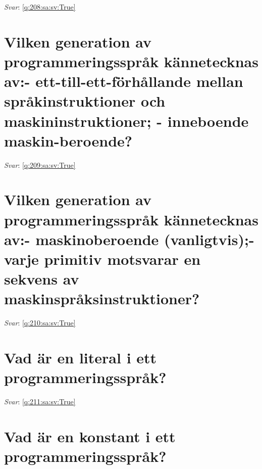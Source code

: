 \documentclass[a4paper,11pt,oneside]{book}
\begin{document}
\begin{sloppypar}
\textit{Svar}: \autoref{q:208:sa:sv:True}



\section{Vilken generation av programmeringsspr\r{a}k k\"annetecknas av:- ett-till-ett-f\"orh\r{a}llande mellan spr\r{a}kinstruktioner och maskininstruktioner; - inneboende maskin-beroende?}

\label{q:209:sa:sv:False}

\vspace{2cm}

\noindent\makebox[\textwidth]{\hrulefill}

\vspace{1cm}

\textit{Svar}: \autoref{q:209:sa:sv:True}



\section{Vilken generation av programmeringsspr\r{a}k k\"annetecknas av:- maskinoberoende (vanligtvis);- varje primitiv motsvarar en sekvens av maskinspr\r{a}ksinstruktioner?}

\label{q:210:sa:sv:False}

\vspace{2cm}

\noindent\makebox[\textwidth]{\hrulefill}

\vspace{1cm}

\textit{Svar}: \autoref{q:210:sa:sv:True}



\section{Vad \"ar en literal i ett programmeringsspr\r{a}k?}

\label{q:211:sa:sv:False}

\vspace{2cm}

\noindent\makebox[\textwidth]{\hrulefill}

\vspace{1cm}

\textit{Svar}: \autoref{q:211:sa:sv:True}



\section{Vad \"ar en konstant i ett programmeringsspr\r{a}k?}


\end{sloppypar}
\end{document}
